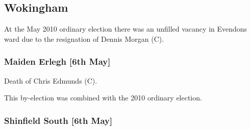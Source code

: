 \begin{resultsiii}
%
%
%
%

\subsection{Wokingham}

At the May 2010 ordinary election there was an unfilled vacancy in Evendons ward due to the resignation of Dennis Morgan (C).


\subsubsection*{Maiden Erlegh \hspace*{\fill}\nolinebreak[1]%
\enspace\hspace*{\fill}
[6th May]}


Death of Chris Edmunds (C).

This by-election was combined with the 2010 ordinary election.

\subsubsection*{Shinfield South \hspace*{\fill}\nolinebreak[1]%
\enspace\hspace*{\fill}
[6th May]}


\end{resultsiii}
